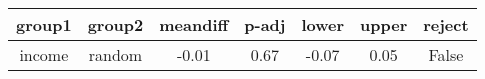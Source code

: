 \begin{tabular}{|c|c|c|c|c|c|c|}
\toprule
 group1 &  group2 &  meandiff &  p-adj &  lower &  upper &  reject \\
\midrule
 income &  random &     -0.01 &   0.67 &  -0.07 &   0.05 &   False \\
\bottomrule
\end{tabular}
